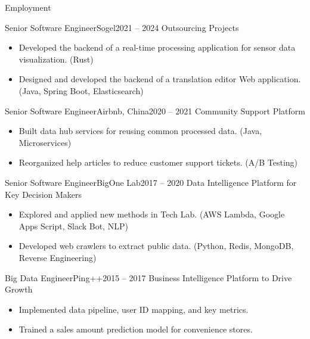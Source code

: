 \documentclass[]{mcdowellcv}
\begin{document}
	\makeheader
	
	\begin{cvsection}{Employment}
		\begin{cvsubsection}{Senior Software Engineer}{Sogel}{2021 – 2024}
			Outsourcing Projects
			\begin{itemize}
				\item Developed the backend of a real-time processing application for sensor data visualization. (Rust)
				\item Designed and developed the backend of a translation editor Web application. (Java, Spring Boot, Elasticsearch)
			\end{itemize}
		\end{cvsubsection}

		\begin{cvsubsection}{Senior Software Engineer}{Airbnb, China}{2020 – 2021}
			Community Support Platform
			\begin{itemize}
				\item Built data hub services for reusing common processed data. (Java, Microservices)
				\item Reorganized help articles to reduce customer support tickets. (A/B Testing)
			\end{itemize}
		\end{cvsubsection}

		\begin{cvsubsection}{Senior Software Engineer}{BigOne Lab}{2017 – 2020}
			Data Intelligence Platform for Key Decision Makers
			\begin{itemize}
				\item Explored and applied new methods in Tech Lab. (AWS Lambda, Google Apps Script, Slack Bot, NLP)
				\item Developed web crawlers to extract public data. (Python, Redis, MongoDB, Reverse Engineering)
			\end{itemize}
		\end{cvsubsection}

		\begin{cvsubsection}{Big Data Engineer}{Ping++}{2015 – 2017}
			Business Intelligence Platform to Drive Growth
			\begin{itemize}
				\item Implemented data pipeline, user ID mapping, and key metrics.
				\item Trained a sales amount prediction model for convenience stores.
			\end{itemize}
		\end{cvsubsection}
		

\end{cvsection}
\end{document}
